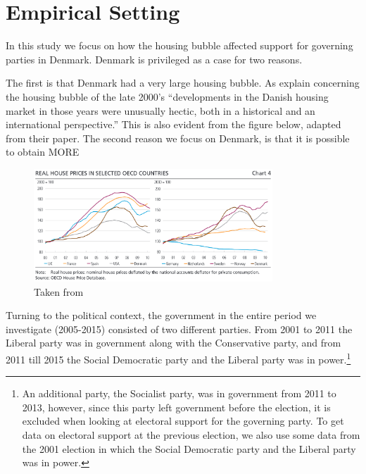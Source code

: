 \documentclass[12pt,a4paper]{article}
\begin{document}
\section{Empirical Setting}

In this study we focus on how the housing bubble affected support for governing parties in Denmark. Denmark is privileged as a case for two reasons.

The first is that Denmark had a very large housing bubble. As \cite[][49]{dam2011housing} explain concerning the housing bubble of the late 2000's ``developments in the Danish housing market in those years were unusually hectic, both in a historical and an international perspective.'' This is also evident from the figure below, adapted from their paper. The second reason we focus on Denmark, is that it is possible to obtain MORE



\begin{figure}
	\includegraphics[width=0.8\textwidth]{../figures/intcomparison}
	\centering
	\caption{Taken from \citep[50]{dam2011housing}}
\end{figure}



Turning to the political context, the government in the entire period we investigate (2005-2015) consisted of two different parties. From 2001 to 2011 the Liberal party was in government along with the Conservative party, and from 2011 till 2015 the Social Democratic party and the Liberal party was in power.\footnote{An additional party, the Socialist party, was in government from 2011 to 2013, however, since this party left government before the election, it is excluded when looking at electoral support for the governing party. To get data on electoral support at the previous election, we also use some data from the 2001 election in which the Social Democratic party and the Liberal party was in power.} 
\end{document}
